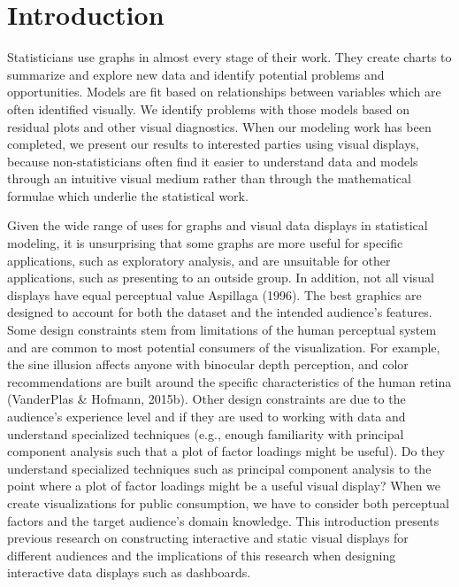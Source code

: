 \documentclass[print]{nuthesis}
\begin{document}
\hypertarget{introduction}{%
\chapter{Introduction}\label{introduction}}

Statisticians use graphs in almost every stage of their work. They create charts to summarize and explore new data and identify potential problems and opportunities.
Models are fit based on relationships between variables which are often identified visually.
We identify problems with those models based on residual plots and other visual diagnostics.
When our modeling work has been completed, we present our results to interested parties using visual displays, because non-statisticians often find it easier to understand data and models through an intuitive visual medium rather than through the mathematical formulae which underlie the statistical work.

Given the wide range of uses for graphs and visual data displays in statistical modeling, it is unsurprising that some graphs are more useful for specific applications, such as exploratory analysis, and are unsuitable for other applications, such as presenting to an outside group.
In addition, not all visual displays have equal perceptual value Aspillaga (1996).
The best graphics are designed to account for both the dataset and the intended audience's features.
Some design constraints stem from limitations of the human perceptual system and are common to most potential consumers of the visualization.
For example, the sine illusion affects anyone with binocular depth perception, and color recommendations are built around the specific characteristics of the human retina (VanderPlas \& Hofmann, 2015b).
Other design constraints are due to the audience's experience level and if they are used to working with data and understand specialized techniques (e.g., enough familiarity with principal component analysis such that a plot of factor loadings might be useful).
Do they understand specialized techniques such as principal component analysis to the point where a plot of factor loadings might be a useful visual display?
When we create visualizations for public consumption, we have to consider both perceptual factors and the target audience's domain knowledge.
This introduction presents previous research on constructing interactive and static visual displays for different audiences and the implications of this research when designing interactive data displays such as dashboards.
\end{document}
